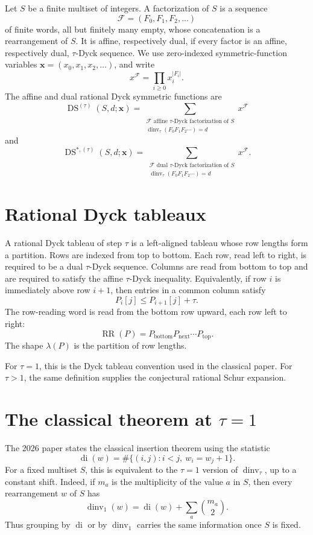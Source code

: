 \documentclass{article}
\DeclareMathOperator{\dinv}{dinv}
\DeclareMathOperator{\di}{di}
\DeclareMathOperator{\RR}{RR}
\newcommand{\DS}{\operatorname{DS}}
\begin{document}
Let \(S\) be a finite multiset of integers.  A factorization of \(S\) is a
sequence
\[
  \mathcal F=(F_0,F_1,F_2,\ldots)
\]
of finite words, all but finitely many empty, whose concatenation is a
rearrangement of \(S\).  It is affine, respectively dual, if every factor is an
affine, respectively dual, \(\tau\)-Dyck sequence.  We use zero-indexed
symmetric-function variables
\(\mathbf x=(x_0,x_1,x_2,\ldots)\), and write
\[
  x^{\mathcal F}=\prod_{i\ge0} x_i^{|F_i|}.
\]
The affine and dual rational Dyck symmetric functions are
\[
  \DS^{(\tau)}(S,d;\mathbf x)
  =
  \sum_{\substack{\mathcal F\text{ affine }\tau\text{-Dyck factorization of }S\\
                  \dinv_\tau(F_0F_1F_2\cdots)=d}}
       x^{\mathcal F}
\]
and
\[
  \operatorname{DS}^{\ast,(\tau)}(S,d;\mathbf x)
  =
  \sum_{\substack{\mathcal F\text{ dual }\tau\text{-Dyck factorization of }S\\
                  \dinv_\tau(F_0F_1F_2\cdots)=d}}
       x^{\mathcal F}.
\]

\section{Rational Dyck tableaux}

A rational Dyck tableau of step \(\tau\) is a left-aligned tableau whose row
lengths form a partition.  Rows are indexed from top to bottom.  Each row,
read left to right, is required to be a dual \(\tau\)-Dyck sequence.  Columns
are read from bottom to top and are required to satisfy the affine
\(\tau\)-Dyck inequality.  Equivalently, if row \(i\) is immediately above row
\(i+1\), then entries in a common column satisfy
\[
  P_i[j]\le P_{i+1}[j]+\tau.
\]
The row-reading word is read from the bottom row upward, each row left to
right:
\[
  \RR(P)=P_{\mathrm{bottom}}P_{\mathrm{next}}\cdots P_{\mathrm{top}}.
\]
The shape \(\lambda(P)\) is the partition of row lengths.

For \(\tau=1\), this is the Dyck tableau convention used in the classical
paper.  For \(\tau>1\), the same definition supplies the conjectural rational
Schur expansion.

\section{The classical theorem at $\tau=1$}

The 2026 paper states the classical insertion theorem using the statistic
\[
  \di(w)=\#\{(i,j):i<j,\ w_i=w_j+1\}.
\]
For a fixed multiset \(S\), this is equivalent to the \(\tau=1\) version of
\(\dinv_\tau\), up to a constant shift.  Indeed, if
\(m_a\) is the multiplicity of the value \(a\) in \(S\), then every
rearrangement \(w\) of \(S\) has
\[
  \dinv_1(w)=\di(w)+\sum_a \binom{m_a}{2}.
\]
Thus grouping by \(\di\) or by \(\dinv_1\) carries the same information once
\(S\) is fixed.
\end{document}
